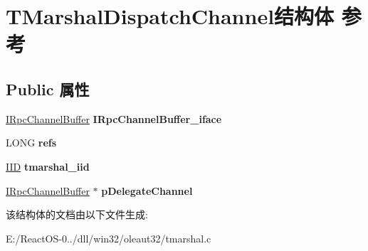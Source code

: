 \hypertarget{struct_t_marshal_dispatch_channel}{}\section{T\+Marshal\+Dispatch\+Channel结构体 参考}
\label{struct_t_marshal_dispatch_channel}
\subsection*{Public 属性}
\begin{DoxyCompactItemize}
\item 
\mbox{\label{struct_t_marshal_dispatch_channel_ae1b43afe9a90354cc205d046cd6732b7}} 
\hyperlink{interface_i_rpc_channel_buffer}{I\+Rpc\+Channel\+Buffer} {\bfseries I\+Rpc\+Channel\+Buffer\+\_\+iface}
\item 
\mbox{\label{struct_t_marshal_dispatch_channel_af82e0e5842c4b63a50c012d4204dc206}} 
L\+O\+NG {\bfseries refs}
\item 
\mbox{\label{struct_t_marshal_dispatch_channel_a6ec477ed405c7be42996be359b3c92e0}} 
\hyperlink{struct___i_i_d}{I\+ID} {\bfseries tmarshal\+\_\+iid}
\item 
\mbox{\label{struct_t_marshal_dispatch_channel_a97a8544373ebd23bbeddc00ec3eb24c9}} 
\hyperlink{interface_i_rpc_channel_buffer}{I\+Rpc\+Channel\+Buffer} $\ast$ {\bfseries p\+Delegate\+Channel}
\end{DoxyCompactItemize}


该结构体的文档由以下文件生成\+:\begin{DoxyCompactItemize}
\item 
E\+:/\+React\+O\+S-\/0../dll/win32/oleaut32/tmarshal.\+c\end{DoxyCompactItemize}
